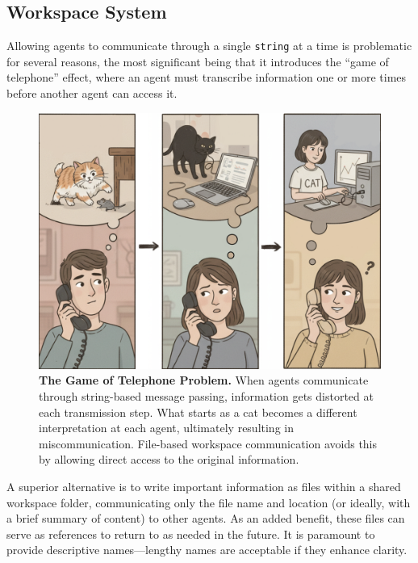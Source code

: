 \documentclass{article}
\begin{document}
\subsection*{Workspace System}
Allowing agents to communicate through a single \texttt{string} at a time is problematic for several reasons, the most significant being that it introduces the ``game of telephone'' effect, where an agent must transcribe information one or more times before another agent can access it.

\begin{figure}[ht]
\vskip 0.2in
\begin{center}
\centerline{\includegraphics[width=\columnwidth]{figures/game_of_telephone}}
\caption{\textbf{The Game of Telephone Problem.} When agents communicate through string-based message passing, information gets distorted at each transmission step. What starts as a cat becomes a different interpretation at each agent, ultimately resulting in miscommunication. File-based workspace communication avoids this by allowing direct access to the original information.}
\label{fig:game_of_telephone}
\end{center}
\vskip -0.2in
\end{figure}

A superior alternative is to write important information as files within a shared workspace folder, communicating only the file name and location (or ideally, with a brief summary of content) to other agents. As an added benefit, these files can serve as references to return to as needed in the future. It is paramount to provide descriptive names---lengthy names are acceptable if they enhance clarity.
\end{document}
